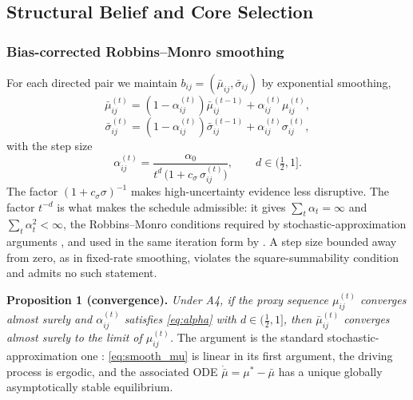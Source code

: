 \documentclass[conference]{IEEEtran}
\begin{document}
\subsection{Structural Belief and Core Selection}

\subsubsection{Bias-corrected Robbins--Monro smoothing}
For each directed pair we maintain $b_{ij}=(\bar\mu_{ij},\bar\sigma_{ij})$ by exponential smoothing,
\begin{equation}
\bar\mu^{(t)}_{ij}=(1-\alpha^{(t)}_{ij})\bar\mu^{(t-1)}_{ij}+\alpha^{(t)}_{ij}\mu^{(t)}_{ij},
\label{eq:smooth_mu}
\end{equation}
\begin{equation}
\bar\sigma^{(t)}_{ij}=(1-\alpha^{(t)}_{ij})\bar\sigma^{(t-1)}_{ij}+\alpha^{(t)}_{ij}\sigma^{(t)}_{ij},
\label{eq:smooth_sigma}
\end{equation}
with the step size
\begin{equation}
\alpha^{(t)}_{ij}=\frac{\alpha_0}{t^{d}\,\bigl(1+c_\sigma\,\sigma^{(t)}_{ij}\bigr)},
\qquad d\in(\tfrac12,1].
\label{eq:alpha}
\end{equation}
The factor $(1+c_\sigma\sigma)^{-1}$ makes high-uncertainty evidence less disruptive. The factor $t^{-d}$ is what makes the schedule admissible: it gives $\sum_t\alpha_t=\infty$ and $\sum_t\alpha_t^2<\infty$, the Robbins--Monro conditions required by stochastic-approximation arguments \cite{borkar2008sa}, and used in the same iteration form by \cite{pieroth2024influence}. A step size bounded away from zero, as in fixed-rate smoothing, violates the square-summability condition and admits no such statement.

\smallskip\noindent\textbf{Proposition 1 (convergence).} \emph{Under A4, if the proxy sequence $\mu^{(t)}_{ij}$ converges almost surely and $\alpha^{(t)}_{ij}$ satisfies \eqref{eq:alpha} with $d\in(\tfrac12,1]$, then $\bar\mu^{(t)}_{ij}$ converges almost surely to the limit of $\mu^{(t)}_{ij}$.} The argument is the standard stochastic-approximation one \cite{borkar2008sa}: \eqref{eq:smooth_mu} is linear in its first argument, the driving process is ergodic, and the associated ODE $\dot{\bar\mu}=\mu^{\ast}-\bar\mu$ has a unique globally asymptotically stable equilibrium.
\end{document}
